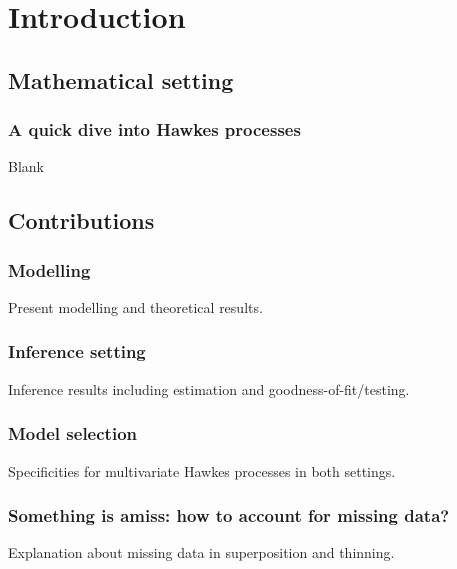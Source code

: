 \chapter{Introduction}

\section{Mathematical setting}
    \subsection{A quick dive into Hawkes processes}
        Blank

\section{Contributions}
    \subsection{Modelling}
        Present modelling and theoretical results.
    \subsection{Inference setting}
        Inference results including estimation and goodness-of-fit/testing.
    \subsection{Model selection}
        Specificities for multivariate Hawkes processes in both settings.
    \subsection{Something is amiss: how to account for missing data?}
        Explanation about missing data in superposition and thinning.



